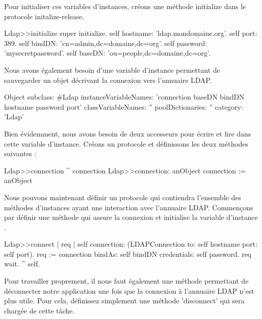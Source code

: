 \documentclass[a4paper,10pt,twoside]{book}
\begin{document}
Pour initialiser ces variables d'instances, cr\'eons une m\'ethode initialize dans le protocole initalize-release.

\begin{code}{}
Ldap>>initialize 
	super initialize. 
	self hostname: 'ldap.mondomaine.org'. 
	self port: 389. 
	self bindDN: 'cn=admin,dc=domaine,dc=org'. 
	self password: 'mysecretpassword'. 
	self baseDN: 'ou=people,dc=domaine,dc=org'.
\end{code}


Nous avons \'egalement besoin d'une variable d'instance permettant de sauvegarder un objet d\'ecrivant la connexion vers l'annuaire LDAP.

\begin{code}{}
Object subclass: #Ldap 
	instanceVariableNames: 'connection baseDN bindDN hostname password port' 
	classVariableNames: '' 
	poolDictionaries: '' 
	category: 'Ldap'
\end{code}

Bien \'evidemment, nous avons besoin de deux accesseurs pour \'ecrire et lire dans cette variable d'instance. Cr\'eons un protocole  et d\'efinissons les deux m\'ethodes suivantes :
\begin{code}{}
Ldap>>connection 
	^ connection
Ldap>>connection: anObject 
	connection := anObject
\end{code}


Nous pouvons maintenant d\'efinir un protocole  qui contiendra l'ensemble des m\'ethodes d'instances ayant une interaction avec l'annuaire LDAP. Commen\c cons par d\'efinir une m\'ethode  qui assure la connexion et initialise la variable d'instance .

\begin{code}
Ldap>>connect 
	| req | 
	self connection: (LDAPConnection to: self hostname port: self port). 
	req := connection bindAs: self bindDN credentials: self password. 
	req wait. 
	^ self.
\end{code}



Pour travailler proprement, il nous faut \'egalement une m\'ethode permettant de d\'econnecter notre application une fois que la connexion \`a l'annuaire LDAP n'est plus utile. Pour cela, d\'efinissez simplement une m\'ethode 'disconnect' qui sera charg\'ee de cette t\^ache.
\end{document}

